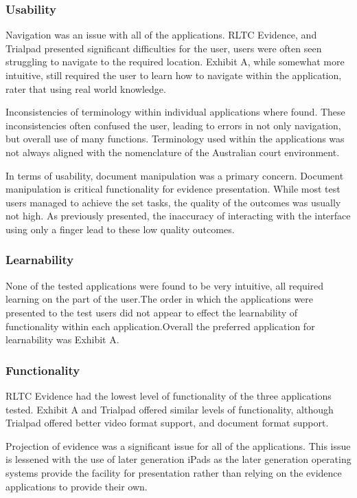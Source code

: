 \subsubsection{Usability}
Navigation was an issue with all of the applications. RLTC Evidence, and Trialpad presented significant difficulties for the user, users were often seen struggling to navigate to the required location. Exhibit A, while somewhat more intuitive, still required the user to learn how to navigate within the application, rater that using real world knowledge. 

Inconsistencies of terminology within individual applications where found. These inconsistencies often confused the user, leading to errors in not only navigation, but overall use of many functions. Terminology used within the applications was not always aligned with the nomenclature of the Australian court environment.

In terms of usability, document manipulation was a primary concern. Document manipulation is critical functionality for evidence presentation. While most test users managed to achieve the set tasks, the quality of the outcomes was usually not high. As previously presented, the inaccuracy of interacting with the interface using only a finger lead to these low quality outcomes.

\subsubsection{Learnability}
None of the tested applications were found to be very intuitive, all required learning on the part of the user.The order in which the applications were presented to the test users did not appear to effect the learnability of functionality within each application.Overall the preferred application for learnability was Exhibit A.

\subsubsection{Functionality}
RLTC Evidence had the lowest level of functionality of the three applications tested. Exhibit A and Trialpad offered similar levels of functionality, although Trialpad offered better video format support, and document format support.

Projection of evidence was a significant issue for all of the applications. This issue is lessened with the use of later generation iPads as the later generation operating systems provide the facility for presentation rather than relying on the evidence applications to provide their own.
